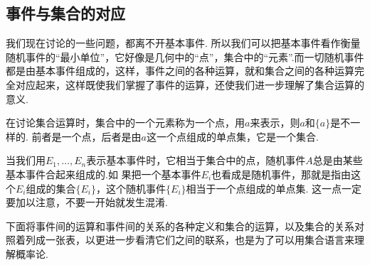 \subsection{事件与集合的对应}
我们现在讨论的一些问题，都离不开基本事件. 所以我们可以把基本事件看作衡量随机事件的“最小单位”，它好像是几何中的“点”，集合中的“元素”.而一切随机事件都是由基本事件组成的，这样，事件之间的各种运算，就和集合之间的各种运算完全对应起来，这样既使我们掌握了事件的运算，还使我们进一步理解了集合运算的意义.

在讨论集合运算时，集合中的一个元素称为一个点，用$a$来表示，则$a$和$\{a\}$是不一样的. 前者是一个点，后者是由$a$这一个点组成的单点集，它是一个集合.

当我们用$E_1,\ldots,E_n$表示基本事件时，它相当于集合中的点，随机事件$A$总是由某些基本事件合起来组成的.如
果把一个基本事件$E_i$也看成是随机事件，那就是指由这个$E_i$组成的集合$\{E_i\}$，这个随机事件$\{E_i\}$相当于一个点组成的单点集. 这一点一定要加以注意，不要一开始就发生混淆.

下面将事件间的运算和事件间的关系的各种定义和集合的运算，以及集合的关系对照着列成一张表，以更进一步看清它们之间的联系，也是为了可以用集合语言来理解概率论.

